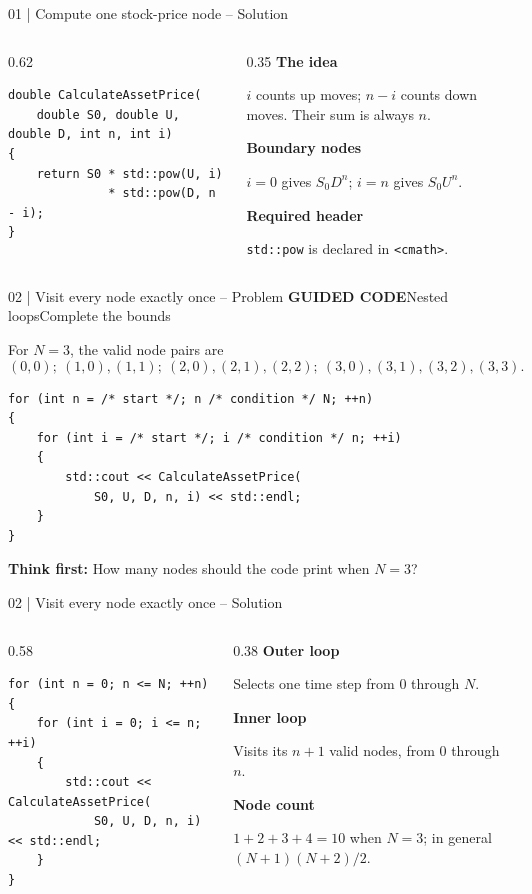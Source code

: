 \documentclass[10pt,aspectratio=169]{beamer}
\newcommand{\problemmeta}[2]{%
 {\color{BootcampBlue}\small\textbf{GUIDED CODE}\quad #1\hfill #2}\par\smallskip\small}
\newcommand{\explain}[2]{%
 {\color{BootcampBlueDark}\textbf{#1}}\par #2\par\medskip}
\begin{document}
\begin{frame}[fragile]{01 | Compute one stock-price node -- Solution}
\begin{columns}[T,onlytextwidth]
\begin{column}{0.62\textwidth}
\begin{lstlisting}[style=solutioncpp]
double CalculateAssetPrice(
    double S0, double U, double D, int n, int i)
{
    return S0 * std::pow(U, i)
              * std::pow(D, n - i);
}
\end{lstlisting}
\end{column}
\begin{column}{0.35\textwidth}
\small
\explain{The idea}{$i$ counts up moves; $n-i$ counts down moves. Their sum is always $n$.}
\explain{Boundary nodes}{$i=0$ gives $S_0D^n$; $i=n$ gives $S_0U^n$.}
\explain{Required header}{\texttt{std::pow} is declared in \texttt{<cmath>}.}
\end{column}
\end{columns}
\end{frame}

\begin{frame}[fragile]{02 | Visit every node exactly once -- Problem}
\problemmeta{Nested loops}{Complete the bounds}
For $N=3$, the valid node pairs are
\[
(0,0);\ (1,0),(1,1);\ (2,0),(2,1),(2,2);\ (3,0),(3,1),(3,2),(3,3).
\]
\begin{lstlisting}
for (int n = /* start */; n /* condition */ N; ++n)
{
    for (int i = /* start */; i /* condition */ n; ++i)
    {
        std::cout << CalculateAssetPrice(
            S0, U, D, n, i) << std::endl;
    }
}
\end{lstlisting}
{\small\color{BootcampBlueDark}\textbf{Think first:} How many nodes should the code print when $N=3$?}
\end{frame}

\begin{frame}[fragile]{02 | Visit every node exactly once -- Solution}
\begin{columns}[T,onlytextwidth]
\begin{column}{0.58\textwidth}
\begin{lstlisting}[style=solutioncpp]
for (int n = 0; n <= N; ++n)
{
    for (int i = 0; i <= n; ++i)
    {
        std::cout << CalculateAssetPrice(
            S0, U, D, n, i) << std::endl;
    }
}
\end{lstlisting}
\end{column}
\begin{column}{0.38\textwidth}
\small
\explain{Outer loop}{Selects one time step from $0$ through $N$.}
\explain{Inner loop}{Visits its $n+1$ valid nodes, from $0$ through $n$.}
\explain{Node count}{$1+2+3+4=10$ when $N=3$; in general $(N+1)(N+2)/2$.}
\end{column}
\end{columns}
\end{frame}
\end{document}
